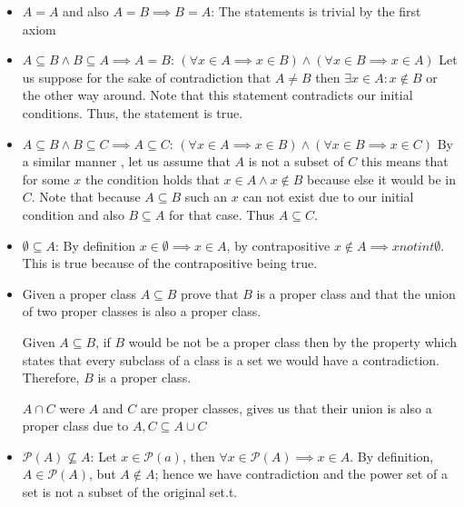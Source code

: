 \begin{itemize}

	\item \(A = A\) and also \(A = B \implies B = A\): The statements is trivial by the first axiom

	\item \(A \subseteq B \land B \subseteq A \implies A = B\): \((\forall x \in A \implies x \in B) \land (\forall x \in B \implies x \in A)\) Let us
	      suppose for the sake of contradiction that \(A \neq B\) then \(\exists x \in A: x \notin B\) or the other way around. Note that this statement contradicts our
	      initial conditions. Thus, the statement is true.

	\item \(A \subseteq B \land B \subseteq C \implies A \subseteq C\): \((\forall x \in A \implies x \in B) \land (\forall x \in B \implies x \in C)\) By a similar manner ,
	      let us assume that \(A\) is not a subset of \(C\) this means that for some \(x\) the condition holds that \(x \in A \land x \notin B\) because else it would be in \(C\).
	      Note that because \(A \subseteq B\) such an \(x\) can not exist due to our initial condition and also \(B \subseteq A\) for that case. Thus \(A \subseteq C\).

	\item \(\emptyset \subseteq A\): By definition \(x \in \emptyset \implies x \in A\), by contrapositive \(x \notin A \implies x notint \emptyset\). This is true
	      because of the contrapositive being true.

	\item Given a proper class \(A \subseteq B\) prove that \(B\) is a proper class and that the union of two proper classes is also a proper class.

	      Given \(A \subseteq B\), if \(B\) would be not be a proper class then by the property which states that every subclass of a class
	      is a set we would have a contradiction. Therefore, \(B\) is a proper class.

	      \(A \cap C\) were \(A\) and \(C\) are proper classes, gives us that their union is also a proper class due to \(A, C \subseteq A \cup C\)

	\item \(\mathcal{P}(A) \nsubseteq A\): Let \(x \in \mathcal{P}(a)\), then \(\forall x \in \mathcal{P}(A) \implies x \in A\). By definition, \(A \in \mathcal{P}(A)\), but
	      \(A \notin A\); hence we have contradiction and the power set of a set is not a subset of the original set.t.

\end{itemize}

